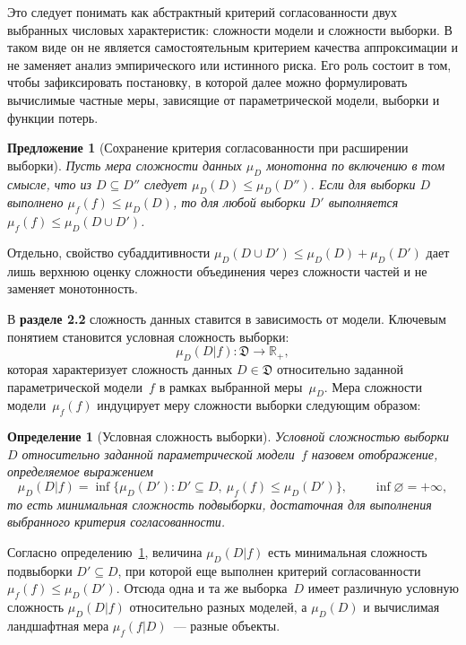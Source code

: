 \documentclass{dissert}
\newtheorem{definition}{Определение}
\newtheorem{proposition}[theorem]{Предложение}
\begin{document}
Это следует понимать как абстрактный критерий согласованности двух выбранных числовых характеристик: сложности модели и сложности выборки. В таком виде он не является самостоятельным критерием качества аппроксимации и не заменяет анализ эмпирического или истинного риска. Его роль состоит в том, чтобы зафиксировать постановку, в которой далее можно формулировать вычислимые частные меры, зависящие от параметрической модели, выборки и функции потерь.

\begin{proposition}[Сохранение критерия согласованности при расширении выборки]
    Пусть мера сложности данных $\mu_D$ монотонна по включению в том смысле, что из $D \subseteq D''$ следует $\mu_D(D) \leq \mu_D(D'')$.
    Если для выборки $D$ выполнено $\mu_f(f) \leq \mu_D(D)$, то для любой выборки $D'$ выполняется $\mu_f(f) \leq \mu_D(D \cup D')$.
\end{proposition}
Отдельно, свойство субаддитивности $\mu_D(D\cup D')\le \mu_D(D)+\mu_D(D')$ дает лишь верхнюю оценку сложности объединения через сложности частей и не заменяет монотонность.

В \textbf{разделе 2.2} сложность данных ставится в зависимость от модели. Ключевым понятием становится условная сложность выборки:
\begin{equation}
    \mu_D(D|f) : \mathfrak{D} \to \mathbb{R}_+,
\end{equation}
которая характеризует сложность данных $D\in\mathfrak{D}$ относительно заданной параметрической модели~$f$ в рамках выбранной меры~$\mu_D$. Мера сложности модели~$\mu_f(f)$ индуцирует меру сложности выборки следующим образом:
\begin{definition}[Условная сложность выборки]\label{def:conditional-complexity}
    Условной сложностью выборки~$D$ относительно заданной параметрической модели~$f$ назовем отображение, определяемое выражением
    \[
        \mu_D(D|f)
        =
        \inf \{ \mu_D(D') : D' \subseteq D,\ \mu_f(f) \leq \mu_D(D') \},
        \qquad
        \inf\varnothing=+\infty,
    \]
    то есть минимальная сложность подвыборки, достаточная для выполнения выбранного критерия согласованности.
\end{definition}
Согласно определению~\ref{def:conditional-complexity}, величина $\mu_D(D|f)$ есть минимальная сложность подвыборки $D'\subseteq D$, при которой еще выполнен критерий согласованности $\mu_f(f)\le\mu_D(D')$.
Отсюда одна и та же выборка~$D$ имеет различную условную сложность $\mu_D(D|f)$ относительно разных моделей, а $\mu_D(D)$ и вычислимая ландшафтная мера $\mu_f(f|D)$~--- разные объекты.
\end{document}

